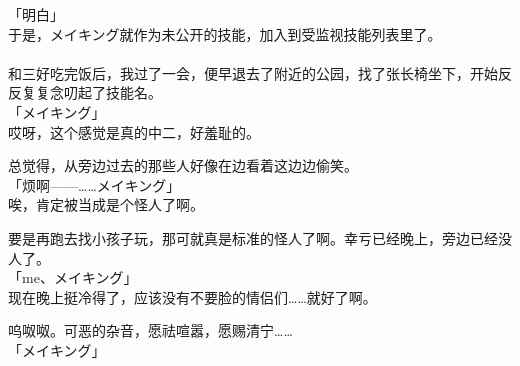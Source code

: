 「明白」\\

于是，メイキング就作为未公开的技能，加入到受监视技能列表里了。\\

\sqsplit\\

和三好吃完饭后，我过了一会，便早退去了附近的公园，找了张长椅坐下，开始反反复复念叨起了技能名。\\

「メイキング」\\

哎呀，这个感觉是真的中二，好羞耻的。

总觉得，从旁边过去的那些人好像在边看着这边边偷笑。\\

「烦啊——……メイキング」\\

唉，肯定被当成是个怪人了啊。

要是再跑去找小孩子玩，那可就真是标准的怪人了啊。幸亏已经晚上，旁边已经没人了。\\

「me、メイキング」\\

现在晚上挺冷得了，应该没有不要脸的情侣们……就好了啊。

呜呶呶。可恶的杂音，愿祛喧嚣，愿赐清宁……\\

「メイキング」\\

